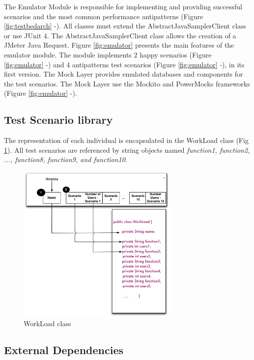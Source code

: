 \documentclass[espaco=umemeio,chapter=TITLE,twoside,openright]{abnt}
\begin{document}
The Emulator Module is responsible for implementing and providing successful scenarios and the most common performance antipatterns (Figure \ref{fig:testbedarch}  -). All classes must extend the AbstractJavaSamplerClient class or use JUnit 4. The AbstractJavaSamplerClient class allows the creation of a JMeter Java Request. Figure \ref{fig:emulator} presents the main features of the emulator module. The module implements 2 happy scenarios (Figure \ref{fig:emulator}  -) and  4 antipatterns test scenarios (Figure \ref{fig:emulator}  -), in its first version. The Mock Layer provides emulated databases and components for the test scenarios. The Mock Layer use the Mockito and PowerMocks frameworks (Figure \ref{fig:emulator}  -).

\subsection{Test Scenario library}

The representation of each individual is encapsulated in the WorkLoad class (Fig \ref{fig:genomeimpl}). All test scenarios are referenced by string objects named \textit{function1, function2, ..., function8, function9, and function10}.


\begin{figure}[!h]
\centering
\includegraphics[width=0.7\textwidth]{./images/genomeimpl.png}
\caption{WorkLoad class}
\label{fig:genomeimpl}
\end{figure}


\subsection{External Dependencies}
\end{document}
